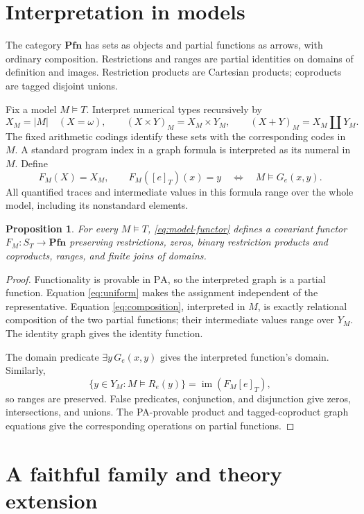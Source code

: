 \documentclass[11pt]{article}
\newtheorem{proposition}[theorem]{Proposition}
\newcommand{\PA}{\mathrm{PA}}
\newcommand{\Pfn}{\mathbf{Pfn}}
\begin{document}
\section{Interpretation in models}\label{sec:models}

The category $\Pfn$ has sets as objects and partial functions as arrows,
with ordinary composition. Restrictions and ranges are partial identities
on domains of definition and images. Restriction products are Cartesian products;
coproducts are tagged disjoint unions.

Fix a model $M\models T$. Interpret numerical types recursively by
\[
 X_M=|M|\quad(X=\omega),\qquad
 (X\times Y)_M=X_M\times Y_M,\qquad
 (X+Y)_M=X_M\amalg Y_M.
\]
The fixed arithmetic codings identify these sets with the corresponding
codes in $M$. A standard program index in a graph formula is interpreted
as its numeral in $M$. Define
\begin{equation}\label{eq:model-functor}
 F_M(X)=X_M,\qquad
 F_M([e]_T)(x)=y
 \quad\Longleftrightarrow\quad M\models G_e(x,y).
\end{equation}
All quantified traces and intermediate values in this formula range over
the whole model, including its nonstandard elements.

\begin{proposition}\label{prop:model}
For every $M\models T$, \eqref{eq:model-functor} defines a covariant
functor $F_M:S_T\to\Pfn$ preserving restrictions, zeros, binary
restriction products and coproducts, ranges, and finite joins of domains.
\end{proposition}
\begin{proof}
Functionality is provable in $\PA$, so the interpreted graph is a
partial function. Equation \eqref{eq:uniform} makes the assignment
independent of the representative. Equation \eqref{eq:composition},
interpreted in $M$, is exactly relational composition of the two partial
functions; their intermediate values range over $Y_M$. The identity
graph gives the identity function.

The domain predicate $\exists y\,G_e(x,y)$ gives the interpreted
function's domain. Similarly,
\[
 \{y\in Y_M:M\models R_e(y)\}
 =\operatorname{im}(F_M[e]_T),
\]
so ranges are preserved. False predicates, conjunction, and disjunction
give zeros, intersections, and unions. The PA-provable product and
tagged-coproduct graph equations give the corresponding operations on
partial functions.
\end{proof}

\section{A faithful family and theory extension}\label{sec:family}
\end{document}
